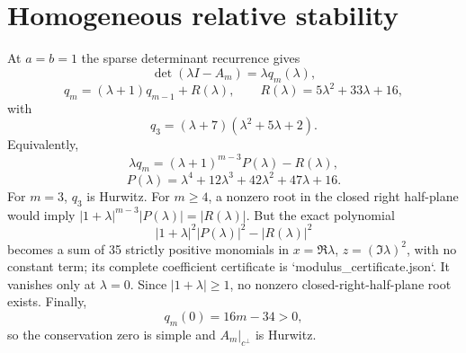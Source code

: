 \section*{Homogeneous relative stability}
At $a=b=1$ the sparse determinant recurrence gives
\[
\det(\lambda I-A_m)=\lambda q_m(\lambda),
\]
\[
q_m=(\lambda+1)q_{m-1}+R(\lambda),
\qquad
R(\lambda)=5\lambda^2+33\lambda+16,
\]
with
\[
q_3=(\lambda+7)(\lambda^2+5\lambda+2).
\]
Equivalently,
\[
\lambda q_m=(\lambda+1)^{m-3}P(\lambda)-R(\lambda),
\]
\[
P(\lambda)=\lambda^4+12\lambda^3+42\lambda^2+47\lambda+16.
\]
For $m=3$, $q_3$ is Hurwitz.  For $m\ge4$, a nonzero root in the closed right
half-plane would imply
$|1+\lambda|^{m-3}|P(\lambda)|=|R(\lambda)|$.  But the exact polynomial
\[
|1+\lambda|^2|P(\lambda)|^2-|R(\lambda)|^2
\]
becomes a sum of 35 strictly positive monomials in
$x=\Re\lambda$, $z=(\Im\lambda)^2$, with no constant term; its complete
coefficient certificate is `modulus_certificate.json`.  It vanishes only at
$\lambda=0$.  Since $|1+\lambda|\ge1$, no nonzero closed-right-half-plane root
exists.  Finally,
\[
q_m(0)=16m-34>0,
\]
so the conservation zero is simple and $A_m|_{c^\perp}$ is Hurwitz.
